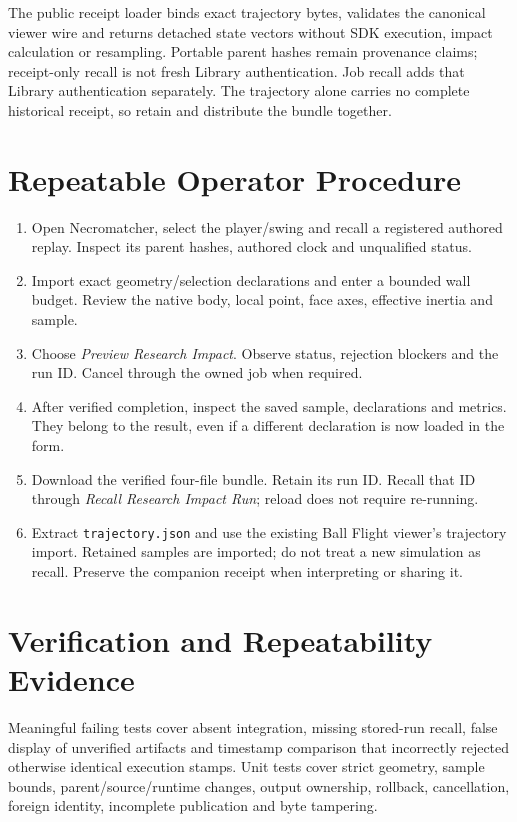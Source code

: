 \documentclass[11pt]{article}
\newcommand{\code}[1]{\nolinkurl{#1}}
\begin{document}
The public receipt loader binds exact trajectory bytes, validates the canonical
viewer wire and returns detached state vectors without SDK execution, impact
calculation or resampling. Portable parent hashes remain provenance claims;
receipt-only recall is not fresh Library authentication. Job recall adds that
Library authentication separately. The trajectory alone carries no complete
historical receipt, so retain and distribute the bundle together.

\newpage
\section*{Repeatable Operator Procedure}
\begin{enumerate}
\item Open Necromatcher, select the player/swing and recall a registered authored replay.
Inspect its parent hashes, authored clock and unqualified status.
\item Import exact geometry/selection declarations and enter a bounded wall budget.
Review the native body, local point, face axes, effective inertia and sample.
\item Choose \emph{Preview Research Impact}. Observe status, rejection blockers and
the run ID. Cancel through the owned job when required.
\item After verified completion, inspect the saved sample, declarations and metrics.
They belong to the result, even if a different declaration is now loaded in the form.
\item Download the verified four-file bundle. Retain its run ID. Recall that ID
through \emph{Recall Research Impact Run}; reload does not require re-running.
\item Extract \code{trajectory.json} and use the existing Ball Flight viewer's
trajectory import. Retained samples are imported; do not treat a new simulation
as recall. Preserve the companion receipt when interpreting or sharing it.
\end{enumerate}

\section*{Verification and Repeatability Evidence}
Meaningful failing tests cover absent integration, missing stored-run recall,
false display of unverified artifacts and timestamp comparison that incorrectly
rejected otherwise identical execution stamps. Unit tests cover strict geometry,
sample bounds, parent/source/runtime changes, output ownership, rollback,
cancellation, foreign identity, incomplete publication and byte tampering.
\end{document}
